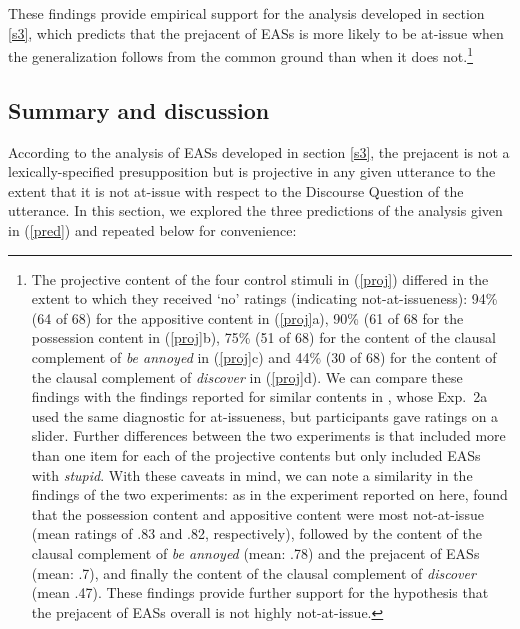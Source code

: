 \documentclass[11pt,fleqn]{article}
\newcommand{\6}{\mbox{$[\hspace*{-.6mm}[$}}
\newcommand{\9}{\mbox{$]\hspace*{-.6mm}]$}}
\begin{document}
These findings provide empirical support for the analysis developed in section \ref{s3}, which predicts that the prejacent of EASs is more likely to be at-issue when the generalization follows from the common ground than when it does not.\footnote{The projective content of the four control stimuli in (\ref{proj}) differed in the extent to which they received `no' ratings (indicating not-at-issueness): 94\% (64 of 68) for the appositive content in (\ref{proj}a), 90\% (61 of 68 for the possession content in (\ref{proj}b), 75\% (51 of 68) for the content of the clausal complement of {\em be annoyed} in (\ref{proj}c) and 44\% (30 of 68) for the content of the clausal complement of {\em discover} in (\ref{proj}d). We can compare these findings with the findings reported for similar contents in \citealt{tbd-variability}, whose Exp.~2a used the same diagnostic for at-issueness, but participants gave ratings on a slider. Further differences between the two experiments is that \citealt{tbd-variability} included more than one item for each of the projective contents but only included EASs with {\em stupid}. With these caveats in mind, we can note a similarity in the findings of the two experiments: as in the experiment reported on here, \citet{tbd-variability} found that the possession content and appositive content were most not-at-issue (mean ratings of .83 and .82, respectively), followed by the content of the clausal complement of {\em be annoyed} (mean: .78) and the prejacent of EASs (mean: .7), and finally the content of the clausal complement of {\em discover} (mean .47). These findings provide further support for the hypothesis that the prejacent of EASs overall is not highly not-at-issue.}



  
\subsection{Summary and discussion}

According to the analysis of EASs developed in section \ref{s3}, the prejacent is not a lexically-specified presupposition but is projective in any given utterance to the extent that it is not at-issue with respect to the Discourse Question of the utterance. In this section, we explored the three predictions of the analysis given in (\ref{pred}) and repeated below for convenience:
\end{document}
